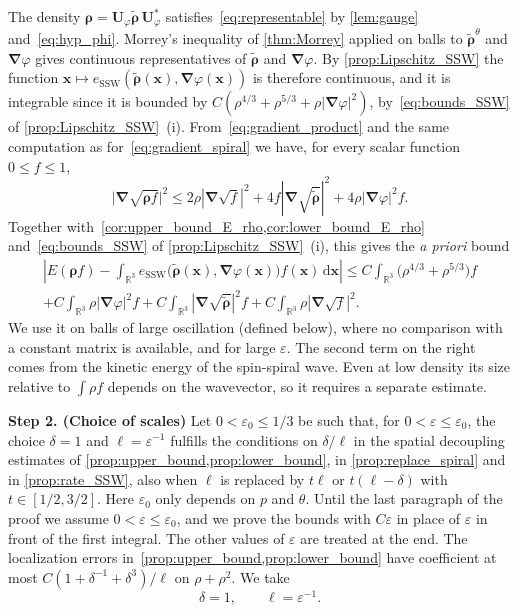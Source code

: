 \documentclass[final,reqno]{amsart}
\theoremstyle{remark}
\renewcommand{\le}{\leqslant}
\renewcommand{\epsilon}{\varepsilon}
\newcommand{\wt}[1]{\widetilde{#1}}
\newcommand{\RR}{\mathbb{R}}
\newcommand{\SSW}{\mathrm{SSW}}
\newcommand{\grad}{\bm{\nabla}}
\newcommand{\dd}{\mathrm{d}}
\begin{document}
The density $\bm{\rho}=\mathbf{U}_\varphi\wt{\bm{\rho}}\,\mathbf{U}_\varphi^*$ satisfies~\cref{eq:representable} by \cref{lem:gauge} and~\cref{eq:hyp_phi}. Morrey's inequality of \cref{thm:Morrey} applied on balls to $\wt{\bm{\rho}}^\theta$ and $\grad\varphi$ gives continuous representatives of $\wt{\bm{\rho}}$ and $\grad\varphi$. By \cref{prop:Lipschitz_SSW} the function $\mathbf{x}\mapsto e_\SSW(\wt{\bm{\rho}}(\mathbf{x}),\grad\varphi(\mathbf{x}))$ is therefore continuous, and it is integrable since it is bounded by $C(\rho^{4/3}+\rho^{5/3}+\rho|\grad\varphi|^2)$, by~\cref{eq:bounds_SSW} of \cref{prop:Lipschitz_SSW}~(i). From~\cref{eq:gradient_product} and the same computation as for~\cref{eq:gradient_spiral} we have, for every scalar function $0\le f\le1$,
\begin{equation}\label{eq:a_priori_LSSWA}
\big|\grad\sqrt{\bm{\rho}f}\big|^2\le2\rho|\grad\sqrt f|^2+4f|\grad\sqrt{\wt{\bm{\rho}}}|^2+4\rho|\grad\varphi|^2 f.
\end{equation}
Together with~\cref{cor:upper_bound_E_rho,cor:lower_bound_E_rho} and~\cref{eq:bounds_SSW} of \cref{prop:Lipschitz_SSW}~(i), this gives the \emph{a priori} bound
\begin{multline}\label{eq:a_priori_LSSWA_2}
\left|E(\bm{\rho}f)-\int_{\RR^3}e_\SSW\big(\wt{\bm{\rho}}(\mathbf{x}),\grad\varphi(\mathbf{x})\big)f(\mathbf{x})\,\dd\mathbf{x}\right|\le C\int_{\RR^3}\big(\rho^{4/3}+\rho^{5/3}\big)f\\
+C\int_{\RR^3}\rho|\grad\varphi|^2 f+C\int_{\RR^3}|\grad\sqrt{\wt{\bm{\rho}}}|^2f+C\int_{\RR^3}\rho|\grad\sqrt f|^2.
\end{multline}
We use it on balls of large oscillation (defined below), where no comparison with a constant matrix is available, and for large $\epsilon$. The second term on the right comes from the kinetic energy of the spin-spiral wave. Even at low density its size relative to $\int\rho f$ depends on the wavevector, so it requires a separate estimate.

\medskip

\noindent\textbf{Step 2. (Choice of scales)} Let $0<\epsilon_0\le1/3$ be such that, for $0<\epsilon\le\epsilon_0$, the choice $\delta=1$ and $\ell=\epsilon^{-1}$ fulfills the conditions on $\delta/\ell$ in the spatial decoupling estimates of \cref{prop:upper_bound,prop:lower_bound}, in \cref{prop:replace_spiral} and in \cref{prop:rate_SSW}, also when $\ell$ is replaced by $t\ell$ or $t(\ell-\delta)$ with $t\in[1/2,3/2]$. Here $\epsilon_0$ only depends on $p$ and $\theta$. Until the last paragraph of the proof we assume $0<\epsilon\le\epsilon_0$, and we prove the bounds with $C\epsilon$ in place of $\epsilon$ in front of the first integral. The other values of $\epsilon$ are treated at the end. The localization errors in~\cref{prop:upper_bound,prop:lower_bound} have coefficient at most $C(1+\delta^{-1}+\delta^3)/\ell$ on $\rho+\rho^2$. We take
$$
\delta=1,\qquad \ell=\epsilon^{-1}.
$$
\end{document}
